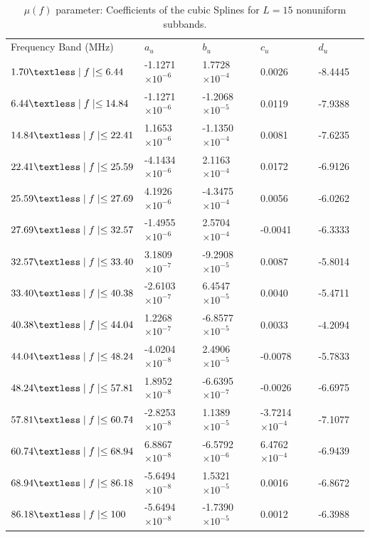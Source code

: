 \documentclass[journal]{IEEEtran}
\begin{document}
\begin{table}[h]
	\setlength\extrarowheight{4.5pt}
	\centering
	\caption{$\mu(f)$ parameter: Coefficients of the cubic Splines for $L=15$ nonuniform subbands.}
	\label{table_alfalW}
	\begin{tabular}{|C{4cm}|C{2.7cm}|C{2.7cm}|C{2.7cm}|C{2.7cm}|m{0cm}}
		Frequency Band (MHz)           		   & $a_u$    			   	   & $b_u$      			  & $c_u$   		 		 & $d_u$ &\\ 
		$1.70\textless \mid f\mid \leq 6.44$   & -1.1271 $\times 10^{-6}$  & 1.7728 $\times 10^{-4}$  & 0.0026	 				 & -8.4445 &\\ 
		$6.44\textless \mid f\mid \leq 14.84$  & -1.1271 $\times 10^{-6}$  & -1.2068 $\times 10^{-5}$ & 0.0119  				 & -7.9388 &\\ 
		$14.84\textless \mid f\mid \leq 22.41$ & 1.1653  $\times 10^{-6}$  & -1.1350 $\times 10^{-4}$ & 0.0081 					 & -7.6235 &\\ 
		$22.41\textless \mid f\mid \leq 25.59$ & -4.1434 $\times 10^{-6}$  & 2.1163 $\times 10^{-4}$  & 0.0172	 				 & -6.9126 &\\ 
		$25.59\textless \mid f\mid \leq 27.69$ & 4.1926 $\times 10^{-6}$   & -4.3475 $\times 10^{-4}$ & 0.0056					 & -6.0262 &\\ 
		$27.69\textless \mid f\mid \leq 32.57$ & -1.4955 $\times 10^{-6}$  & 2.5704 $\times 10^{-4}$  & -0.0041	 				 & -6.3333 &\\ 
		$32.57\textless \mid f\mid \leq 33.40$ & 3.1809 $\times 10^{-7}$   & -9.2908 $\times 10^{-5}$ & 0.0087   				 & -5.8014 &\\ 
		$33.40\textless \mid f\mid \leq 40.38$ & -2.6103 $\times 10^{-7}$  & 6.4547 $\times 10^{-5}$  & 0.0040 					 & -5.4711 &\\ 
		$40.38\textless \mid f\mid \leq 44.04$ & 1.2268  $\times 10^{-7}$  & -6.8577 $\times 10^{-5}$ & 0.0033					 & -4.2094 &\\ 
		$44.04\textless \mid f\mid \leq 48.24$ & -4.0204 $\times 10^{-8}$  & 2.4906 $\times 10^{-5}$  & -0.0078	 				 & -5.7833 &\\ 
		$48.24\textless \mid f\mid \leq 57.81$ & 1.8952  $\times 10^{-8}$  & -6.6395 $\times 10^{-7}$ & -0.0026  				 & -6.6975 &\\ 
		$57.81\textless \mid f\mid \leq 60.74$ & -2.8253  $\times 10^{-8}$ & 1.1389 $\times 10^{-5}$  & -3.7214 $\times 10^{-4}$ & -7.1077 &\\ 
		$60.74\textless \mid f\mid \leq 68.94$ & 6.8867 $\times 10^{-8}$   & -6.5792 $\times 10^{-6}$ & 6.4762	$\times 10^{-4}$ & -6.9439 &\\ 
		$68.94\textless \mid f\mid \leq 86.18$ & -5.6494  $\times 10^{-8}$ & 1.5321 $\times 10^{-5}$  & 0.0016 				     & -6.8672 &\\ 
		$86.18\textless \mid f\mid \leq 100$   & -5.6494 $\times 10^{-8}$  & -1.7390 $\times 10^{-5}$ & 0.0012  				 & -6.3988 &\\ 
	\end{tabular}
\end{table}
\end{document}
